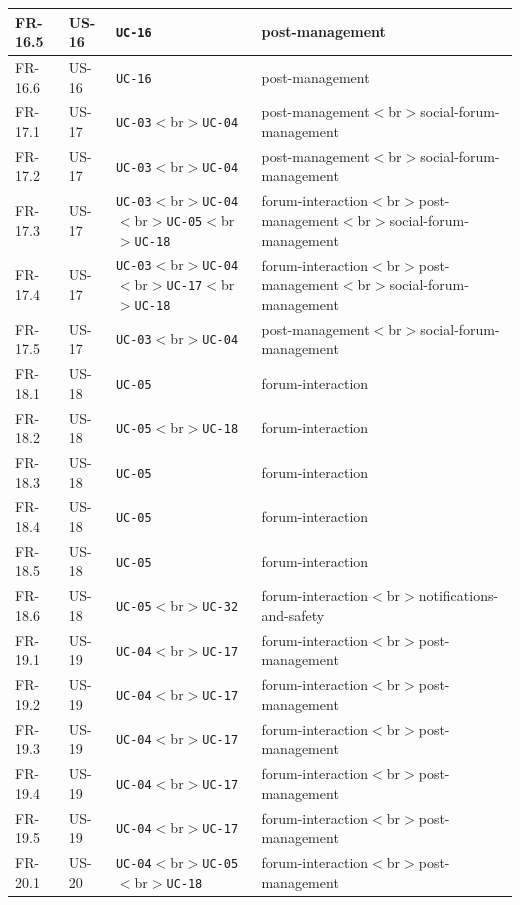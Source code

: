 \documentclass[12pt]{article}
\begin{document}
\begin{longtable}{|>{\raggedright\arraybackslash}p{}|>{\raggedright\arraybackslash}p{}|>{\raggedright\arraybackslash}p{}|>{\raggedright\arraybackslash}p{}|}
FR-16.5 & US-16 & \texttt{UC-16} & post-management \\ \hline
FR-16.6 & US-16 & \texttt{UC-16} & post-management \\ \hline
FR-17.1 & US-17 & \texttt{UC-03}$<$br$>$\texttt{UC-04} & post-management$<$br$>$social-forum-management \\ \hline
FR-17.2 & US-17 & \texttt{UC-03}$<$br$>$\texttt{UC-04} & post-management$<$br$>$social-forum-management \\ \hline
FR-17.3 & US-17 & \texttt{UC-03}$<$br$>$\texttt{UC-04}$<$br$>$\texttt{UC-05}$<$br$>$\texttt{UC-18} & forum-interaction$<$br$>$post-management$<$br$>$social-forum-management \\ \hline
FR-17.4 & US-17 & \texttt{UC-03}$<$br$>$\texttt{UC-04}$<$br$>$\texttt{UC-17}$<$br$>$\texttt{UC-18} & forum-interaction$<$br$>$post-management$<$br$>$social-forum-management \\ \hline
FR-17.5 & US-17 & \texttt{UC-03}$<$br$>$\texttt{UC-04} & post-management$<$br$>$social-forum-management \\ \hline
FR-18.1 & US-18 & \texttt{UC-05} & forum-interaction \\ \hline
FR-18.2 & US-18 & \texttt{UC-05}$<$br$>$\texttt{UC-18} & forum-interaction \\ \hline
FR-18.3 & US-18 & \texttt{UC-05} & forum-interaction \\ \hline
FR-18.4 & US-18 & \texttt{UC-05} & forum-interaction \\ \hline
FR-18.5 & US-18 & \texttt{UC-05} & forum-interaction \\ \hline
FR-18.6 & US-18 & \texttt{UC-05}$<$br$>$\texttt{UC-32} & forum-interaction$<$br$>$notifications-and-safety \\ \hline
FR-19.1 & US-19 & \texttt{UC-04}$<$br$>$\texttt{UC-17} & forum-interaction$<$br$>$post-management \\ \hline
FR-19.2 & US-19 & \texttt{UC-04}$<$br$>$\texttt{UC-17} & forum-interaction$<$br$>$post-management \\ \hline
FR-19.3 & US-19 & \texttt{UC-04}$<$br$>$\texttt{UC-17} & forum-interaction$<$br$>$post-management \\ \hline
FR-19.4 & US-19 & \texttt{UC-04}$<$br$>$\texttt{UC-17} & forum-interaction$<$br$>$post-management \\ \hline
FR-19.5 & US-19 & \texttt{UC-04}$<$br$>$\texttt{UC-17} & forum-interaction$<$br$>$post-management \\ \hline
FR-20.1 & US-20 & \texttt{UC-04}$<$br$>$\texttt{UC-05}$<$br$>$\texttt{UC-18} & forum-interaction$<$br$>$post-management \\ \hline

\end{longtable}
\end{document}
